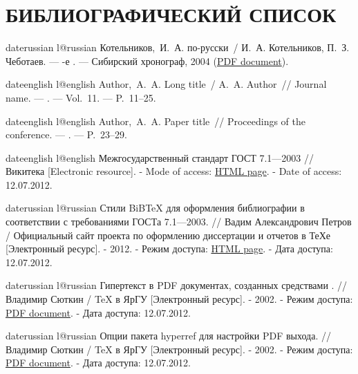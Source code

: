 \chapter*{БИБЛИОГРАФИЧЕСКИЙ СПИСОК}


\begin{thebibliography}{6}
\def\selectlanguageifdefined#1{
\expandafter\ifx\csname date#1\endcsname\relax
\else\language\csname l@#1\endcsname\fi}

\selectlanguageifdefined{russian}
Котельников,~И.~А. \LaTeXe{} по-русски~/ И.~А. Котельников, П.~З.
  Чеботаев. ---
-е {\cyr\cyri\cyrz\cyrd.} ---
\newblock Сибирский хронограф, 2004 (\href{http://www.tex.uniyar.ac.ru/doc/kotelnikovchebotaev2004b.pdf}{PDF document}).

\selectlanguageifdefined{english}
Author,~A.~A. Long title~/ A.~A. Author~// Journal name. ---
. ---
\newblock Vol.~11. ---
\newblock P.~11--25.

\selectlanguageifdefined{english}
Author,~A.~A. Paper title~// Proceedings of the conference. ---
. ---
\newblock P.~23--29.

\selectlanguageifdefined{english}
Межгосударственный стандарт ГОСТ 7.1—2003 // Викитека [Electronic resource]. - Mode of access:
\href{http://ru.wikisource.org/wiki/ГОСТ_7.1—2003}{HTML page}.  - Date of access: 12.07.2012.

\selectlanguageifdefined{russian}
Стили BiB\TeX{} для оформления библиографии в соответствии с требованиями ГОСТа 7.1—2003. // Вадим Александрович Петров / Официальный сайт проекта по оформлению диссертации и отчетов в ТеХе  [Электронный ресурс]. - 2012.
 - Режим доступа: \href{http://thesisby.at.tut.by/gost71_2003.html}{HTML page}. - Дата доступа: 12.07.2012.

\selectlanguageifdefined{russian}
Гипертекст в PDF документах, созданных средствами \LaTeXe. // Владимир Сюткин / \TeX{} в ЯрГУ  [Электронный ресурс]. - 2002.
 - Режим доступа: \href{http://www.tex.uniyar.ac.ru/doc/href\_in\_LaTeX.pdf}{PDF document}. - Дата доступа: 12.07.2012.

\selectlanguageifdefined{russian}
Опции пакета hyperref для настройки PDF выхода. // Владимир Сюткин / \TeX{} в ЯрГУ  [Электронный ресурс]. - 2002. - Режим доступа:
\href{http://www.tex.uniyar.ac.ru/doc/hyperref\_options.pdf}{PDF document}.  - Дата доступа: 12.07.2012.


\end{thebibliography}
